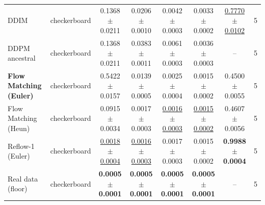 \begin{tabular}{llcccccc}
\midrule
DDIM & checkerboard & 0.1368 $\pm$ 0.0211 & 0.0206 $\pm$ 0.0010 & 0.0042 $\pm$ 0.0003 & 0.0033 $\pm$ 0.0002 & \underline{0.7770 $\pm$ 0.0102} & 5 \\
DDPM ancestral & checkerboard & 0.1368 $\pm$ 0.0211 & 0.0383 $\pm$ 0.0011 & 0.0061 $\pm$ 0.0003 & 0.0036 $\pm$ 0.0003 & -- & 5 \\
\textbf{Flow Matching (Euler)} & checkerboard & 0.5422 $\pm$ 0.0157 & 0.0139 $\pm$ 0.0005 & 0.0025 $\pm$ 0.0004 & 0.0015 $\pm$ 0.0002 & 0.4500 $\pm$ 0.0055 & 5 \\
Flow Matching (Heun) & checkerboard & 0.0915 $\pm$ 0.0034 & 0.0017 $\pm$ 0.0003 & \underline{0.0016 $\pm$ 0.0003} & \underline{0.0015 $\pm$ 0.0002} & 0.4607 $\pm$ 0.0056 & 5 \\
Reflow-1 (Euler) & checkerboard & \underline{0.0018 $\pm$ 0.0004} & \underline{0.0016 $\pm$ 0.0003} & 0.0017 $\pm$ 0.0003 & 0.0015 $\pm$ 0.0002 & \textbf{0.9988 $\pm$ 0.0004} & 5 \\
Real data (floor) & checkerboard & \textbf{0.0005 $\pm$ 0.0001} & \textbf{0.0005 $\pm$ 0.0001} & \textbf{0.0005 $\pm$ 0.0001} & \textbf{0.0005 $\pm$ 0.0001} & -- & 5 \\
\bottomrule
\end{tabular}
